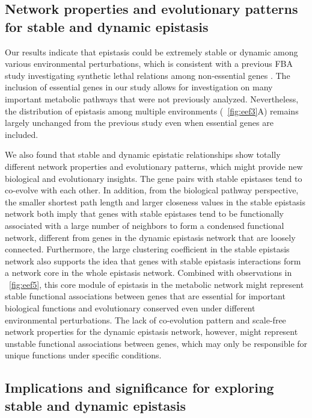 \subsection{Network properties and evolutionary patterns for stable
and dynamic epistasis}

Our results indicate that epistasis could be extremely stable or
dynamic among various environmental perturbations, which is consistent
with a previous FBA study investigating synthetic lethal relations
among non-essential genes \citep{Harrison2007}. The inclusion of
essential genes in our study allows for investigation on many
important metabolic
pathways that were not previously analyzed. Nevertheless, the
distribution of epistasis among multiple environments (\Fig~\ref{fig:eef3}A)
remains largely unchanged from the previous study \citep{Harrison2007}
even when essential genes are included.

We also found that stable and dynamic epistatic relationships show
totally different network properties and evolutionary patterns, which
might provide new biological and evolutionary insights. The gene pairs
with stable epistases tend to co-evolve with each other. In addition,
from the biological pathway perspective, the smaller shortest path
length and larger closeness values in the stable epistasis network
both imply that genes with stable epistases tend to be functionally
associated with a large number of neighbors to form a condensed
functional network, different from genes in the dynamic epistasis
network that are loosely connected. Furthermore, the large clustering
coefficient in the stable epistasis network also supports the idea
that genes with stable epistasis interactions form a network core in
the whole epistasis network. Combined with observations in \Fig~\ref{fig:eef5},
this core module of epistasis in the metabolic network might represent
stable functional associations between genes that are essential for
important biological functions and evolutionary conserved even under
different environmental perturbations. The lack of co-evolution
pattern and scale-free network properties for the dynamic epistasis
network, however, might represent unstable functional associations
between genes, which may only be responsible for unique functions
under specific conditions.

\subsection{Implications and significance for exploring stable and
dynamic epistasis}

